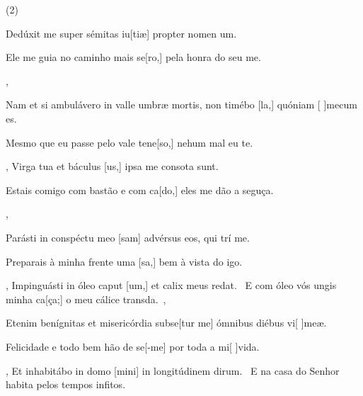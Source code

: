 \SetVersePairs(2){
  {\item {}Dedúxit me super sémitas iu[tiæ] propter nomen um.~\Responsorium}%
    {\item {}Ele me guia no caminho mais se[ro,] pela honra do seu me.~\Responsorium},
  {\item {}Nam et si ambulávero in valle umbræ mortis, non timébo [la,] quóniam [ ]{me}cum es.~\Responsorium}%
    {\item {}Mesmo que eu passe pelo vale tene[so,] nehum mal eu te.~\Responsorium},
  {Virga tua et báculus [us,] ipsa me consota sunt.~\Responsorium}%
    {\item {}Estais comigo com bastão e com ca[do,] eles me dão a seguça.~\Responsorium},
  {\item {}Parásti in conspéctu meo [sam] advérsus eos, qui trí me.~\Responsorium}%
    {\item {}Preparais à minha frente uma [sa,] bem à vista do igo.~\Responsorium},
  {Impinguásti in óleo caput [um,] et calix meus redat.~\Responsorium}%
    {E com óleo vós ungis minha ca[ça;] o meu cálice trans\-da.~\Responsorium},
  {\item {}Etenim benígnitas et misericórdia subse[tur me] ómnibus diébus vi[ ]{me}æ.~\Responsorium}%
    {\item {}Felicidade e todo bem hão de se[-me] por toda a mi[ ]{vi}da.~\Responsorium},
  {Et inhabitábo in domo [mini] in longitúdinem dirum.~\Responsorium}%
    {E na casa do Senhor habita pelos tempos infi\-tos.~\Responsorium}
}
